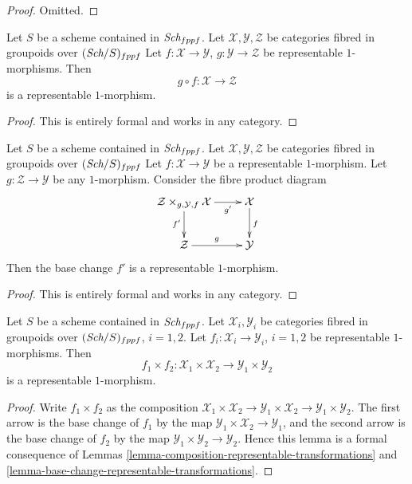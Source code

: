 \begin{proof}
Omitted.
\end{proof}

\begin{lemma}
\label{lemma-composition-representable-transformations}
Let $S$ be a scheme contained in $\textit{Sch}_{fppf}$.
Let $\mathcal{X}, \mathcal{Y}, \mathcal{Z}$
be categories fibred in groupoids over $(\textit{Sch}/S)_{fppf}$
Let $f : \mathcal{X} \to \mathcal{Y}$, $g : \mathcal{Y} \to \mathcal{Z}$
be representable $1$-morphisms. Then
$$
g \circ f : \mathcal{X} \longrightarrow \mathcal{Z}
$$
is a representable $1$-morphism.
\end{lemma}

\begin{proof}
This is entirely formal and works in any category.
\end{proof}

\begin{lemma}
\label{lemma-base-change-representable-transformations}
Let $S$ be a scheme contained in $\textit{Sch}_{fppf}$.
Let $\mathcal{X}, \mathcal{Y}, \mathcal{Z}$
be categories fibred in groupoids over $(\textit{Sch}/S)_{fppf}$
Let $f : \mathcal{X} \to \mathcal{Y}$ be a representable $1$-morphism.
Let $g : \mathcal{Z} \to \mathcal{Y}$ be any $1$-morphism.
Consider the fibre product diagram
$$
\xymatrix{
\mathcal{Z} \times_{g, \mathcal{Y}, f} \mathcal{X} \ar[r]_-{g'} \ar[d]_{f'} &
\mathcal{X} \ar[d]^f \\
\mathcal{Z} \ar[r]^g & \mathcal{Y}
}
$$
Then the base change $f'$ is a representable $1$-morphism.
\end{lemma}

\begin{proof}
This is entirely formal and works in any category.
\end{proof}

\begin{lemma}
\label{lemma-product-representable-transformations}
Let $S$ be a scheme contained in $\textit{Sch}_{fppf}$.
Let $\mathcal{X}_i, \mathcal{Y}_i$ be categories fibred in groupoids over
$(\textit{Sch}/S)_{fppf}$, $i = 1, 2$.
Let $f_i : \mathcal{X}_i \to \mathcal{Y}_i$, $i = 1, 2$
be representable $1$-morphisms.
Then
$$
f_1 \times f_2 :
\mathcal{X}_1 \times \mathcal{X}_2
\longrightarrow
\mathcal{Y}_1 \times \mathcal{Y}_2
$$
is a representable $1$-morphism.
\end{lemma}

\begin{proof}
Write $f_1 \times f_2$ as the composition
$\mathcal{X}_1 \times \mathcal{X}_2 \to
\mathcal{Y}_1 \times \mathcal{X}_2 \to
\mathcal{Y}_1 \times \mathcal{Y}_2$.
The first arrow is the base change of $f_1$ by the map
$\mathcal{Y}_1 \times \mathcal{X}_2 \to \mathcal{Y}_1$, and the second arrow
is the base change of $f_2$ by the map
$\mathcal{Y}_1 \times \mathcal{Y}_2 \to \mathcal{Y}_2$.
Hence this lemma is a formal
consequence of Lemmas \ref{lemma-composition-representable-transformations}
and \ref{lemma-base-change-representable-transformations}.
\end{proof}



